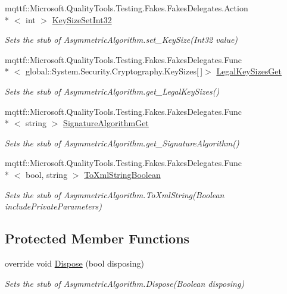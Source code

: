 \begin{DoxyCompactItemize}
mqttf\-::\-Microsoft.\-Quality\-Tools.\-Testing.\-Fakes.\-Fakes\-Delegates.\-Action\\*
$<$ int $>$ \hyperlink{class_system_1_1_security_1_1_cryptography_1_1_fakes_1_1_stub_asymmetric_algorithm_a5cac0f8fcf71ffb114ecd1da1ebbf9c6}{Key\-Size\-Set\-Int32}
\begin{DoxyCompactList}\small\item\em Sets the stub of Asymmetric\-Algorithm.\-set\-\_\-\-Key\-Size(\-Int32 value)\end{DoxyCompactList}\item 
mqttf\-::\-Microsoft.\-Quality\-Tools.\-Testing.\-Fakes.\-Fakes\-Delegates.\-Func\\*
$<$ global\-::\-System.\-Security.\-Cryptography.\-Key\-Sizes\mbox{[}$\,$\mbox{]}$>$ \hyperlink{class_system_1_1_security_1_1_cryptography_1_1_fakes_1_1_stub_asymmetric_algorithm_a181300d4a2ee1ac27eb4e42e9ab35309}{Legal\-Key\-Sizes\-Get}
\begin{DoxyCompactList}\small\item\em Sets the stub of Asymmetric\-Algorithm.\-get\-\_\-\-Legal\-Key\-Sizes()\end{DoxyCompactList}\item 
mqttf\-::\-Microsoft.\-Quality\-Tools.\-Testing.\-Fakes.\-Fakes\-Delegates.\-Func\\*
$<$ string $>$ \hyperlink{class_system_1_1_security_1_1_cryptography_1_1_fakes_1_1_stub_asymmetric_algorithm_a8a917fb9255d2cacf4aec9fc6c272b7a}{Signature\-Algorithm\-Get}
\begin{DoxyCompactList}\small\item\em Sets the stub of Asymmetric\-Algorithm.\-get\-\_\-\-Signature\-Algorithm()\end{DoxyCompactList}\item 
mqttf\-::\-Microsoft.\-Quality\-Tools.\-Testing.\-Fakes.\-Fakes\-Delegates.\-Func\\*
$<$ bool, string $>$ \hyperlink{class_system_1_1_security_1_1_cryptography_1_1_fakes_1_1_stub_asymmetric_algorithm_a5b7d68a7be790341fdf9fc7a4cfb8f64}{To\-Xml\-String\-Boolean}
\begin{DoxyCompactList}\small\item\em Sets the stub of Asymmetric\-Algorithm.\-To\-Xml\-String(\-Boolean include\-Private\-Parameters)\end{DoxyCompactList}\end{DoxyCompactItemize}
\subsection*{Protected Member Functions}
\begin{DoxyCompactItemize}
\item 
override void \hyperlink{class_system_1_1_security_1_1_cryptography_1_1_fakes_1_1_stub_asymmetric_algorithm_a324bdb41907d4b3ba947eff0fcc6c34d}{Dispose} (bool disposing)
\begin{DoxyCompactList}\small\item\em Sets the stub of Asymmetric\-Algorithm.\-Dispose(\-Boolean disposing)\end{DoxyCompactList}\end{DoxyCompactItemize}
